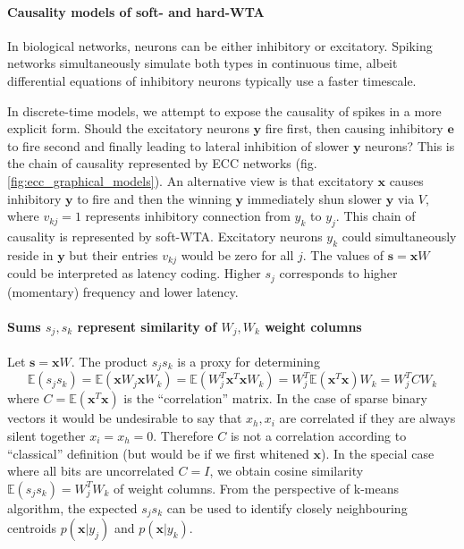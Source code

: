 \documentclass[12pt]{article}
\begin{document}
\paragraph{Causality models of soft- and hard-WTA}
In biological networks, neurons can be either inhibitory or excitatory. Spiking networks simultaneously simulate both types in continuous time, albeit differential equations of inhibitory neurons typically use a faster timescale. 

In discrete-time models, we attempt to expose the causality of spikes in a more explicit form. Should the excitatory neurons $\boldsymbol{y}$ fire first, then causing inhibitory $\boldsymbol{e}$ to fire second and finally leading to lateral inhibition of slower $\boldsymbol{y}$ neurons? This is the chain of causality represented by ECC networks (fig. \ref{fig:ecc_graphical_models}). An alternative view is that excitatory $\boldsymbol{x}$ causes inhibitory $\boldsymbol{y}$ to fire and then the winning  $\boldsymbol{y}$ immediately shun slower  $\boldsymbol{y}$ via  $V$, where $v_{kj}=1$ represents inhibitory connection from $y_k$ to $y_j$. This chain of causality is represented by soft-WTA. Excitatory neurons $y_k$ could simultaneously reside in $\boldsymbol{y}$ but their entries $v_{kj}$ would be zero for all $j$.  The values of $\boldsymbol{s}=\boldsymbol{x} W$ could be interpreted as latency coding. Higher $s_j$ corresponds to higher (momentary) frequency and lower latency. 

\paragraph{Sums $s_j,s_k$ represent similarity of $W_j,W_k$ weight columns}
Let $\boldsymbol{s}=\boldsymbol{x} W$. The product $s_j s_k$ is a proxy for determining
\[
\mathbb{E}(s_j s_k) =  \mathbb{E}(\boldsymbol{x} W_j \boldsymbol{x} W_k)=  \mathbb{E}(W_j^T \boldsymbol{x}^T  \boldsymbol{x} W_k) = W_j^T \mathbb{E}(\boldsymbol{x}^T  \boldsymbol{x}) W_k = W_j^T C W_k 
\]
where $C=\mathbb{E}(\boldsymbol{x}^T  \boldsymbol{x})$ is the ``correlation'' matrix. In the case of sparse binary vectors it would be undesirable to say that $x_h,x_i$ are correlated if they are always silent together $x_i=x_h=0$. Therefore  $C$ is not a correlation according to ``classical'' definition (but would be if we first whitened $\boldsymbol{x}$). 
In the special case where all bits are uncorrelated $C=I$, we obtain cosine similarity $\mathbb{E}(s_j s_k)=W_j^TW_k$ of weight columns. From the  perspective of k-means algorithm, the expected $s_j s_k$ can be used to identify closely neighbouring centroids $p(\boldsymbol{x}|y_j)$ and $p(\boldsymbol{x}|y_k)$. 
\end{document}
